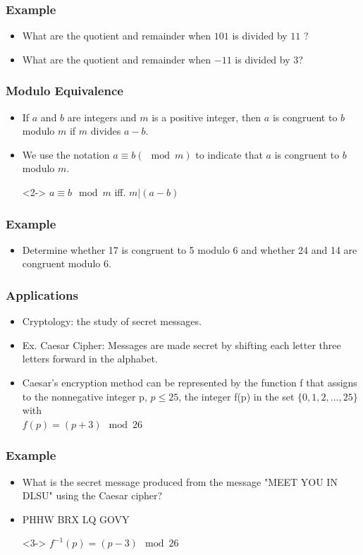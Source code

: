\documentclass{beamer}
\begin{document}
\begin{frame}
\frametitle{\huge Example}
\Large
\begin{itemize} 
\item <1-> What are the quotient and remainder when $101$ is divided by $11$ ?
\item <2-> What are the quotient and remainder when $-11$ is divided by $3$? 
\end{itemize}
 \end{frame}


\begin{frame}
\frametitle{\huge Modulo Equivalence}
\Large
\begin{itemize} 
\item <1-> If $a$ and $b$ are integers and $m$ is a positive integer, then $a$ is congruent to $b$ modulo $m$ if $m$
divides $a - b$.  
\item<2-> We use the notation $a \equiv b (\mod m )$ to indicate that $a$ is congruent to $b$ modulo $m$. 
\item[] <2-> \qquad $a \equiv b \mod m$ iff. $m | (a-b)$
\end{itemize}
 \end{frame}


\begin{frame}
\frametitle{\huge Example}
\Large
\begin{itemize} 
\item <1-> Determine whether 17 is congruent to 5 modulo 6 and whether 24 and 14 are congruent modulo 6.
\end{itemize}
 \end{frame}


\begin{frame}
\frametitle{\huge Applications}
\Large
\begin{itemize} 
\item <1-> Cryptology: the study of secret messages. 
\item <1->  Ex. Caesar Cipher: Messages are made secret by shifting each letter three letters forward in the alphabet.
\item <2-> Caesar's encryption method can be represented by the function f that assigns to the nonnegative integer p, $p \le 25$, the integer f(p) in the set $\{0, 1 , 2 , . . . , 25\}$ with \\
\qquad $f(p) = (p + 3) \mod 26$
\end{itemize}
 \end{frame}


\begin{frame}
\frametitle{\huge Example}
\Large
\begin{itemize} 
\item <1-> What is the secret message produced from the message "MEET YOU IN DLSU" using the Caesar cipher?
\item <2-> PHHW BRX LQ GOVY
\item[] <3-> \qquad $f^{-1}(p) = (p - 3) \mod 26$
\end{itemize}
 \end{frame}
\end{document}
